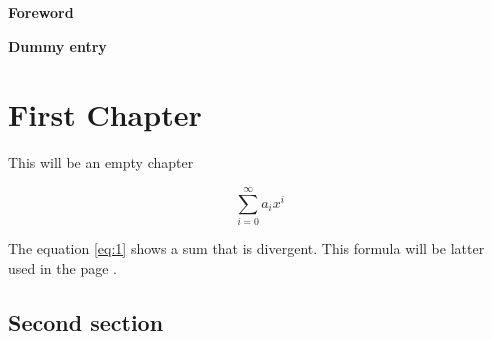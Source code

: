 \documentclass{book}
\begin{document}
\frontmatter

\tableofcontents

\clearpage

{\huge {\bf Foreword}} 

\Blindtext

\clearpage

{\huge {\bf Dummy entry}} 

\Blindtext



\mainmatter

\chapter{First Chapter}

This will be an empty chapter

\begin{equation}
\label{eq:1}
\sum_{i=0}^{\infty} a_i x^i
\end{equation}

The equation \ref{eq:1} shows a sum that is divergent. This formula will be latter used in the page \pageref{second}.

\Blindtext

\clearpage

\section{Second section} \label{second}

\blindtext



\Blinddocument
\end{document}
